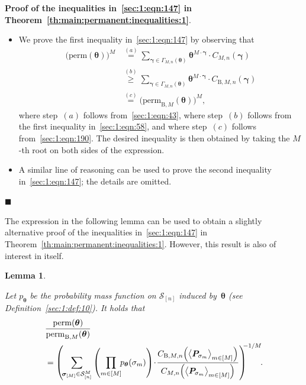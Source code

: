 \documentclass[journal,lettersize,twocolumn]{IEEEtran} %
\renewcommand\qedsymbol{$\blacksquare$}
\newtheorem{lemma}[theorem]{Lemma}
\newcommand{\etheoremproof}{\hfill\qedsymbol}
\newcommand{\vect}[1]{ \bm{#1} }
\newcommand{\set}[1]{\mathcal{#1}}
\newcommand{\vgam}{ \vect{\gamma} }
\newcommand{\matr}[1]{ \bm{#1} }
\newcommand{\perm}{ \mathrm{perm} }
\newcommand{\permbM}[1]{\perm_{ \mathrm{B}, #1 }}
\newcommand{\pmtheta}{p_{\mtheta}}
\newcommand{\vsigma}{ \bm{\sigma} }
\newcommand{\setS}{\set{S}}
\newcommand{\CM}[1]{\Cgen{M}{#1}}
\newcommand{\Cgen}[2]{C_{#1,#2}}
\newcommand{\CBM}[1]{\CBgen{M}{#1}}
\newcommand{\CBgen}[2]{C_{\mathrm{B},#1,#2}}
\newcommand{\mtheta}{\matr{\theta}}
\newcommand{\vtheta}{\matr{\theta}}
\newcommand{\mP}{\matr{P}}
\newcommand{\GamMnthe}{ \Gamma_{M,n}(\vtheta) }
\begin{document}
\noindent
\textbf{Proof of the inequalities in~\eqref{sec:1:eqn:147} in
  Theorem~\ref{th:main:permanent:inequalities:1}}.
\begin{itemize}

\item We prove the first inequality in~\eqref{sec:1:eqn:147} by observing that
  \begin{align*}
    \bigl( \perm(\mtheta) \bigr)^M
      &\overset{(a)}{=} 
         \sum_{\vgam \in \GamMnthe} 
           \mtheta^{ M \cdot \vgam }
           \cdot
           \CM{n}( \vgam )
             \nonumber \\
      &\overset{(b)}{\geq}
         \sum_{\vgam \in \GamMnthe} 
           \mtheta^{ M \cdot \vgam }
           \cdot
           \CBM{n}( \vgam )
             \nonumber \\
      &\overset{(c)}{=}
         \bigl( \permbM{M}(\mtheta) \bigr)^M,
  \end{align*}
  where step~$(a)$ follows from~\eqref{sec:1:eqn:43}, where step~$(b)$ follows
  from the first inequality in~\eqref{sec:1:eqn:58}, and where step~$(c)$
  follows from~\eqref{sec:1:eqn:190}. The desired inequality is then obtained
  by taking the $M$-th root on both sides of the expression.

\item A similar line of reasoning can be used to prove the second inequality
  in~\eqref{sec:1:eqn:147}; the details are omitted.

\end{itemize}
\etheoremproof

%

\medskip

The expression in the following lemma can be used to obtain a slightly
alternative proof of the inequalities in~\eqref{sec:1:eqn:147} in
Theorem~\ref{th:main:permanent:inequalities:1}. However, this result is also
of interest in itself.

%

\begin{lemma}
  \label{lemma:ratio:perm:permbM:1}

  Let $\pmtheta$ be the probability mass function on $\setS_{[n]}$ induced
  by~$\mtheta$ (see Definition~\ref{sec:1:def:10}). It holds that
  \begin{align}
    &
    \frac{\perm(\mtheta)}
         {\permbM{M}(\mtheta)} \nonumber \\
      &= \left( \!
           \sum_{ \vsigma_{[M]} \in \setS_{[n]}^{M} }
             \left(
               \prod_{m \in [M]} \!\!
                 \pmtheta(\sigma_m)
             \right)
             \! \cdot \!
             \frac{\CBM{n}
                     \Bigl(
                       \bigl\langle \mP_{\sigma_{m}} \bigr\rangle_{m \in [M]}
                     \Bigr)}
                  {\CM{n}
                     \Bigl(
                       \bigl\langle \mP_{\sigma_{m}} \bigr\rangle_{m \in [M]}
                     \Bigr)}
         \right)^{\!\!\! -1/M} \!\! .
           \label{eq:ratio:perm:permbM:1}
  \end{align}
\end{lemma}
\end{document}
